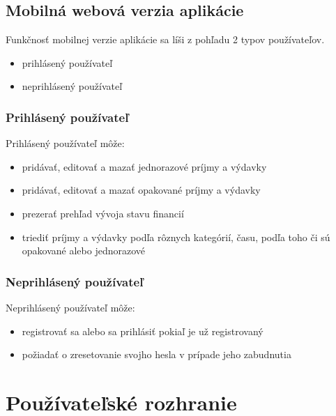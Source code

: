 \documentclass[12pt,oneside]{book}
\begin{document}
\subsection{Mobilná webová verzia aplikácie}
Funkčnosť mobilnej verzie aplikácie sa líši z pohľadu 2 typov používateľov.
\begin{itemize}
\item{prihlásený používateľ}
\item{neprihlásený používateľ}
\end{itemize}

\subsubsection{Prihlásený používateľ}
Prihlásený používateľ môže:
\begin{itemize}
\item{pridávať, editovať a mazať jednorazové príjmy a výdavky}
\item{pridávať, editovať a mazať opakované príjmy a výdavky}
\item{prezerať prehľad vývoja stavu financií}
\item{triediť príjmy a výdavky podľa rôznych kategórií, času, podľa toho či sú opakované alebo jednorazové}
\end{itemize}

\subsubsection{Neprihlásený používateľ}
Neprihlásený používateľ môže:
\begin{itemize}
\item{registrovať sa alebo sa prihlásiť pokiaľ je už registrovaný}
\item{požiadať o zresetovanie svojho hesla v prípade jeho zabudnutia}
\end{itemize}

\section{Používateľské rozhranie}
\end{document}
